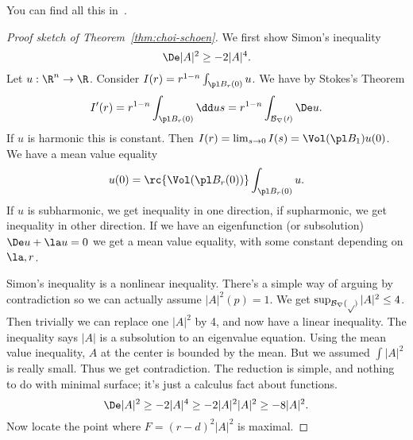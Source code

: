 You can find all this in~\cite{CM}.

\begin{proof}[Proof sketch of Theorem~\ref{thm:choi-schoen}]
We first show Simon's inequality
\[
\De|A|^2\ge -2|A|^4.
\]
Let $u:\R^n\to \R$. Consider $I(r)=r^{1-n}\int_{\pl B_r(0)} u$. We have by Stokes's Theorem%
\[
I'(r)=r^{1-n}\int_{\pl B_r(0)}\dd us = r^{1-n}\int_{\cal B_r(0)}\De u.
\]
If $u$ is harmonic this is constant. 
Then $I(r)=\lim_{s\to 0} I(s)=\Vol(\pl B_1)u(0)$. We have a mean value equality
\[
u(0)=\rc{\Vol(\pl B_r(0))}\int_{\pl B_r(0)}u.
\]
If $u$ is subharmonic, we get inequality in one direction, if supharmonic, we get inequality in other direction.
If we have an eigenfunction (or subsolution) $\De u +\la u=0$ we get a mean value equality, with some constant depending on $\la, r$.

Simon's inequality is a nonlinear inequality. There's a simple way of arguing by contradiction so we can actually assume $|A|^2(p)=1$. We get $\sup_{\cal B_r(p)}|A|^2\le 4$. Then trivially we can replace one $|A|^2$ by 4, and now have a linear inequality. The inequality says $|A|$ is a subsolution to an eigenvalue equation. Using the mean value inequality, $A$ at the center is bounded by the mean. But we assumed $\int |A|^2$ is really small. Thus we get contradiction. The reduction is simple, and nothing to do with minimal surface; it's just a calculus fact about functions. 
\[
\De|A|^2\ge -2|A|^4\ge -2|A|^2|A|^2\ge -8|A|^2.
\]
Now locate the point where $F=(r-d)^2|A|^2$ is maximal. %
\end{proof}